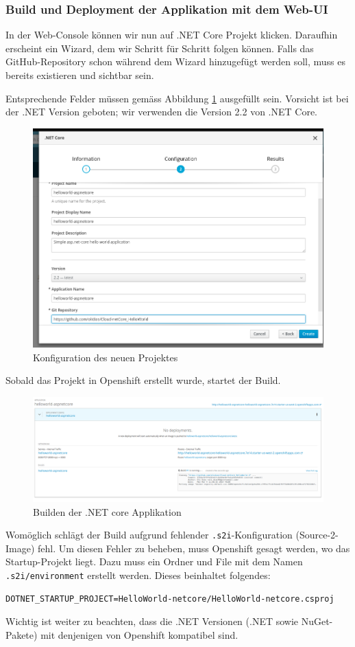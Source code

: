\documentclass[12pt,a4paper]{article}
\begin{document}
\subsubsection{Build und Deployment der Applikation mit dem Web-UI}\label{sec:net-webui}
In der Web-Console können wir nun auf .NET Core Projekt klicken. Daraufhin erscheint ein Wizard, dem wir Schritt für Schritt folgen können. Falls das GitHub-Repository schon während dem Wizard hinzugefügt werden soll, muss es bereits existieren und sichtbar sein. 

Entsprechende Felder müssen gemäss Abbildung \ref{fig:os-new-config} ausgefüllt sein. Vorsicht ist bei der .NET Version geboten; wir verwenden die Version 2.2 von .NET Core. 
\begin{figure}[h]
	\centering
	\includegraphics[width=0.7\linewidth]{img/os-new-config}
	\caption{Konfiguration des neuen Projektes}
	\label{fig:os-new-config}
\end{figure}

Sobald das Projekt in Openshift erstellt wurde, startet der Build. 
\begin{figure}[h]
	\centering
	\includegraphics[width=0.7\linewidth]{img/os-building}
	\caption{Builden der .NET core Applikation}
	\label{fig:os-building}
\end{figure}
Womöglich schlägt der Build aufgrund fehlender \texttt{.s2i}-Konfiguration (Source-2-Image) fehl. Um diesen Fehler zu beheben, muss Openshift gesagt werden, wo das Startup-Projekt liegt. Dazu muss ein Ordner und File mit dem Namen \texttt{.s2i/environment} erstellt werden. Dieses beinhaltet folgendes:
\begin{lstlisting}[breaklines=true]
DOTNET_STARTUP_PROJECT=HelloWorld-netcore/HelloWorld-netcore.csproj
\end{lstlisting}
Wichtig ist weiter zu beachten, dass die .NET Versionen (.NET sowie NuGet-Pakete) mit denjenigen von Openshift kompatibel sind. 
\end{document}
